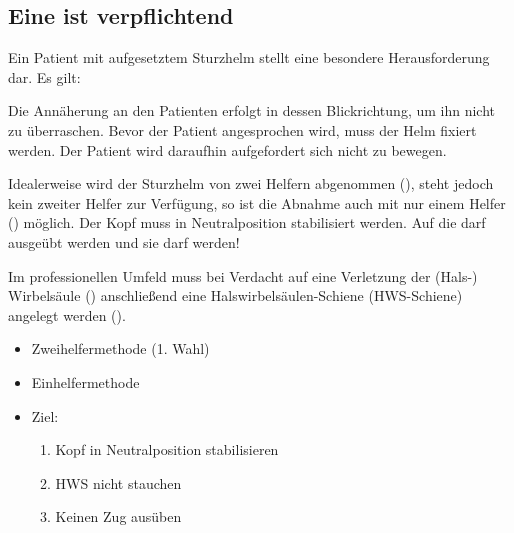 \subsection{Eine  ist verpflichtend}
\label{topic:sturzhelmabnahme}


\TextSlide{\TxBeschreibung}
{Ein Patient mit aufgesetztem Sturzhelm stellt eine
besondere Herausforderung dar. Es gilt:
\begin{Synopsis}
\end{Synopsis}

Die Annäherung an den Patienten erfolgt in dessen
Blickrichtung, um ihn nicht zu überraschen. Bevor der
Patient angesprochen wird, muss der Helm fixiert
werden. Der Patient wird daraufhin aufgefordert sich nicht
zu bewegen. 

Idealerweise wird der Sturzhelm von zwei Helfern abgenommen
(), 
steht jedoch kein zweiter Helfer zur Verfügung, so
ist die Abnahme 
auch mit nur einem Helfer 
() 
möglich. Der Kopf
muss in Neutralposition stabilisiert werden. Auf
die  darf  ausgeübt
werden und sie darf 
werden!~\cite{ITLSde6,AsboeLehrmeinungRd2011-07}

Im professionellen Umfeld muss bei Verdacht auf eine
Verletzung der (Hals-) Wirbelsäule
()
anschließend eine Halswirbelsäulen-Schiene (HWS-Schiene) angelegt 
werden (). 
}{
\begin{itemize}
  \item Zweihelfermethode (1. Wahl)
  \item Einhelfermethode
  \item Ziel:
  \begin{enumerate}
    \item Kopf in Neutralposition
    stabilisieren
    \item HWS nicht stauchen
    \item Keinen Zug ausüben
  \end{enumerate}
\end{itemize}
}
{}
{}
{}


